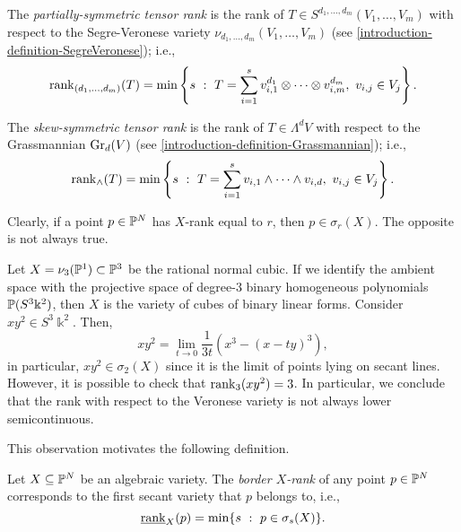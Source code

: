 \begin{definition}
\label{classicalAG-definition-partially_symmetric_tensor_rank}
    The \emph{partially-symmetric tensor rank} is the rank of $T \in S^{d_1,\ldots,d_m}(V_1,\ldots,V_m)$ with respect to the Segre-Veronese variety $\nu_{d_1,\ldots,d_m}(V_1,\ldots,V_m)$ (see \ref{introduction-definition-SegreVeronese}); i.e., 
    \[
        \mathrm{rank}_{(d_1,\ldots,d_m)}(T) = \min\left\{s ~:~ T = \sum_{i=1}^s v_{i,1}^{d_1}\otimes \cdots \otimes v_{i,m}^{d_m}, ~ v_{i,j} \in V_j\right\}.
    \]
\end{definition}

\begin{definition}
\label{classicalAG-definition-skewsymmetric_tensor_rank}
    The \emph{skew-symmetric tensor rank} is the rank of $T \in \Lambda^dV$ with respect to the Grassmannian $\mathrm{Gr}_d(V)$ (see \ref{introduction-definition-Grassmannian}); i.e., 
    \[
        \mathrm{rank}_{\wedge}(T) = \min\left\{s ~:~ T = \sum_{i=1}^s v_{i,1}\wedge \dots \wedge v_{i,d}, ~ v_{i,j} \in V_j\right\}.
    \]
\end{definition}

Clearly, if a point $p \in \mathbb{P}^N$ has $X$-rank equal to $r$, then $p \in \sigma_r(X)$. The opposite is not always true. 

\begin{example}
    Let $X = \nu_3(\mathbb{P}^1) \subset \mathbb{P}^3$ be the rational normal cubic. If we identify the ambient space with the projective space of degree-$3$ binary homogeneous polynomials $\mathbb{P}(S^3\Bbbk^2)$, then $X$ is the variety of cubes of binary linear forms. Consider $xy^2 \in S^3\Bbbk^2$. Then, 
    \[
        xy^2 = \lim_{t \to 0} \frac{1}{3t}\left( x^3 - (x-ty)^3\right),
    \]
    in particular, $xy^2 \in \sigma_2(X)$ since it is the limit of points lying on secant lines. However, it is possible to check that $\mathrm{rank}_3(xy^2) = 3$. In particular, we conclude that the rank with respect to the Veronese variety is not always lower semicontinuous. 
\end{example}
This observation motivates the following definition. 
\begin{definition}
    \label{classicalAG-definition-border_rank}
    Let $X \subseteq \mathbb{P}^N$ be an algebraic variety. The \emph{border $X$-rank} of any point $p \in \mathbb{P}^N$ corresponds to the first secant variety that $p$ belongs to, i.e., 
    \[
        \underline{\mathrm{rank}}_X(p) = \min\{s ~:~ p \in \sigma_s(X)\}.
    \]
\end{definition}

